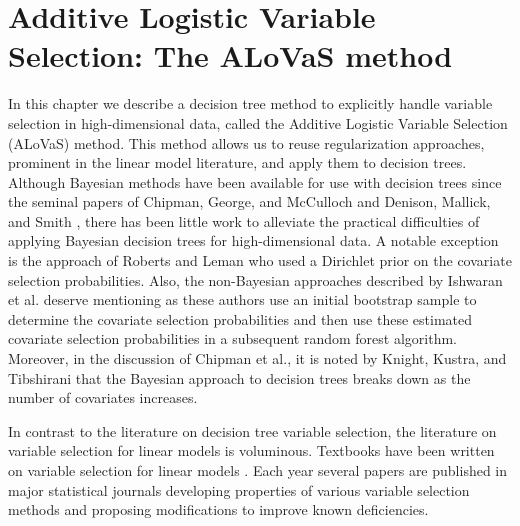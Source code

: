\chapter{Additive Logistic Variable Selection: The ALoVaS method}\label{sec:Introduction}

In this chapter we describe a decision tree method to explicitly handle variable selection in high-dimensional data, called the Additive Logistic Variable Selection  (ALoVaS) method. This method allows us to reuse regularization approaches, prominent in the linear model literature, and apply them to decision trees. Although Bayesian methods have been available for use with decision trees since the seminal papers of Chipman, George, and McCulloch \cite{chipman1998bayesian}  and Denison, Mallick, and Smith \cite{denison1998bayesian}, there has been little work to alleviate the practical difficulties of applying Bayesian decision trees for high-dimensional data. A notable exception is the approach of Roberts and Leman \cite{Roberts:2013uq} who used a Dirichlet prior on the covariate selection probabilities. Also, the non-Bayesian approaches described by Ishwaran et al. \cite{ishwaran2011random,ishwaran2010high,ishwaran2007variable} deserve mentioning  as these authors use an initial bootstrap sample to determine the covariate selection probabilities and then use these estimated covariate selection probabilities in a subsequent random forest algorithm. Moreover, in the discussion of Chipman et al., it is noted by Knight, Kustra, and Tibshirani \cite{knight1998bayesian} that the Bayesian approach to decision trees breaks down as the number of covariates increases. 

In contrast to the literature on decision tree variable selection, the literature on variable selection for linear models is voluminous. Textbooks have been written on variable selection for linear models \cite{miller2002subset}. Each year several papers are published in major statistical journals developing properties of various variable selection methods and proposing modifications to improve known deficiencies. 

